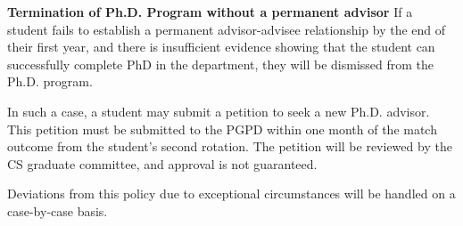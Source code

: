 \begin{enumerate}
\begin{itemize}
\end{itemize}

\end{enumerate}


\textbf{Termination of Ph.D. Program without a permanent advisor} 
If a student fails to establish a permanent advisor-advisee relationship by the end of their first year, and there is insufficient evidence showing that the student can successfully complete PhD in the department, they will be dismissed from the Ph.D. program.

In such a case, a student may submit a petition to seek a new Ph.D. advisor. This petition must be submitted to the PGPD within one month of the match outcome from the student's second rotation. 
The petition will be reviewed by the CS graduate committee, and approval is not guaranteed.

Deviations from this policy due to exceptional circumstances will be
handled on a case-by-case basis.